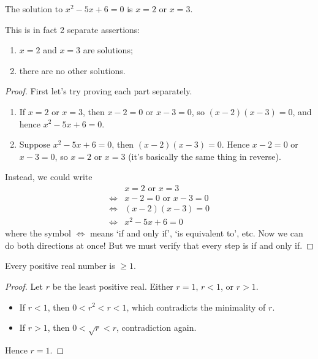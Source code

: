 \documentclass{../../template/note}
\begin{document}
    \begin{claim}
        The solution to \(x^2 - 5x + 6 = 0\) is \(x = 2\) or \(x = 3\).
    \end{claim}

    \noindent This is in fact 2 separate assertions:

    \begin{enumerate}
        \item \(x = 2\) and \(x = 3\) are solutions;
        \item there are no other solutions.
    \end{enumerate}
    
    \begin{proof}
        First let's try proving each part separately.
        \begin{enumerate}
            \item If \(x=2\) or \(x=3\), then \(x-2=0\) or \(x-3=0\), so \((x-2)(x-3)=0\), and hence \(x^2-5x+6=0\).
            \item Suppose \(x^2-5x+6=0\), then \((x-2)(x-3)=0\). Hence \(x-2 = 0\) or \(x-3 = 0\), so \(x=2\) or \(x=3\) (it's basically the same thing in reverse).
        \end{enumerate}
        Instead, we could write
        \begin{align*}
            &x=2 \text{ or } x=3 \\
            \iff& x-2 = 0 \text{ or } x-3 = 0 \\
            \iff& (x-2)(x-3) = 0 \\
            \iff& x^2-5x+6 = 0
        \end{align*}
        where the symbol \(\iff\) means `if and only if', `is equivalent to', etc. Now we can do both directions at once! But we must verify that every step is if and only if.        
    \end{proof}

    \begin{claim}
        Every positive real number is \(\geq 1\).
    \end{claim}
    \begin{proof}
        Let \(r\) be the least positive real. Either \(r=1\), \(r<1\), or \(r>1\).
        \begin{itemize}
            \item If \(r<1\), then \(0 < r^2 < r < 1\), which contradicts the minimality of \(r\).
            \item If \(r>1\), then \(0 < \sqrt r < r\), contradiction again.
        \end{itemize}
        Hence \(r=1\).
    \end{proof}
    
\end{document}
